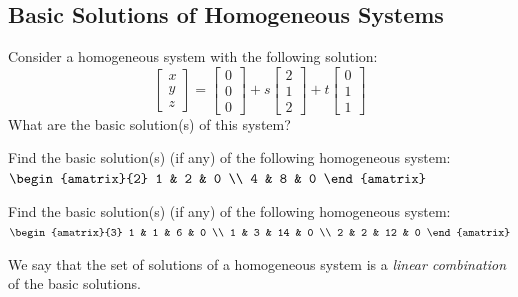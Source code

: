 \documentclass[11pt]{exam}
\begin{document}
    \subsection{Basic Solutions of Homogeneous Systems}
        \begin{questions}
            \item Consider a homogeneous system with the following solution:
            $$\begin{bmatrix} x \\ y \\ z \end{bmatrix}
            = \begin{bmatrix} 0 \\ 0 \\ 0 \end{bmatrix}
            + s \begin{bmatrix} 2 \\ 1 \\ 2 \end{bmatrix}
            + t \begin{bmatrix} 0 \\ 1 \\ 1 \end{bmatrix}$$
            What are the basic solution(s) of this system?

            \item Find the basic solution(s) (if any) of the following homogeneous system: \\
            $\begin{amatrix}{2}
                1 & 2 & 0 \\
                4 & 8 & 0
            \end{amatrix}$

            \item Find the basic solution(s) (if any) of the following homogeneous system: \\
            $\begin{amatrix}{3}
                1 & 1 & 6 & 0 \\
                1 & 3 & 14 & 0 \\
                2 & 2 & 12 & 0
            \end{amatrix}$
        \end{questions}

        \vspace{20px}
        We say that the set of solutions of a homogeneous system is a \textit{linear combination} of the basic solutions.
\end{document}
